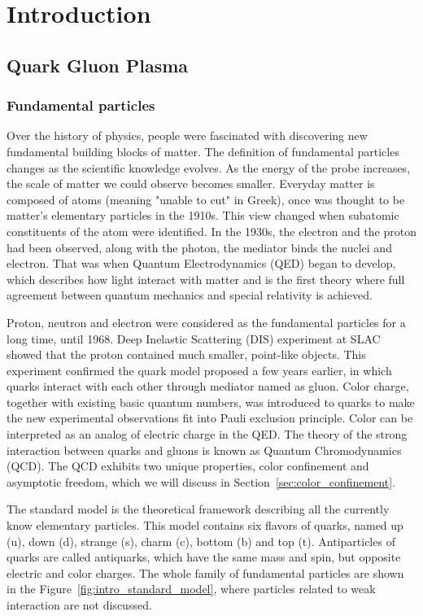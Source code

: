 \section{Introduction}
\label{chapter:intro}

\subsection{Quark Gluon Plasma}

\subsubsection{Fundamental particles}

Over the history of physics, people were fascinated with discovering new fundamental building blocks of matter. The definition of fundamental particles changes as the scientific knowledge evolves. As the energy of the probe increases, the scale of matter we could observe becomes smaller. Everyday matter is composed of atoms (meaning "unable to cut" in Greek), once was thought to be matter's elementary particles in the 1910s. This view changed when subatomic constituents of the atom were identified. In the 1930s, the electron and the proton had been observed, along with the photon, the mediator binds the nuclei and electron. That was when Quantum Electrodynamics (QED) began to develop, which describes how light interact with matter and is the first theory where full agreement between quantum mechanics and special relativity is achieved.

Proton, neutron and electron were considered as the fundamental particles for a long time, until 1968. Deep Inelastic Scattering (DIS) experiment at SLAC showed that the proton contained much smaller, point-like objects. This experiment confirmed the quark model proposed a few years earlier, in which quarks interact with each other through mediator named as gluon. Color charge, together with existing basic quantum numbers, was introduced to quarks to make the new experimental observations fit into Pauli exclusion principle. Color can be interpreted as an analog of electric charge in the QED. The theory of the strong interaction between quarks and gluons is known as Quantum Chromodynamics (QCD). The QCD exhibits two unique properties, color confinement and asymptotic freedom, which we will discuss in Section~\ref{sec:color_confinement}.

The standard model is the theoretical framework describing all the currently know elementary particles. This model contains six flavors of quarks, named up (u), down (d), strange (s), charm (c), bottom (b) and top (t). Antiparticles of quarks are called antiquarks, which have the same mass and spin, but opposite electric and color charges. The whole family of fundamental particles are shown in the Figure~\ref{fig:intro_standard_model}, where particles related to weak interaction are not discussed.

